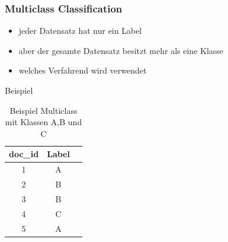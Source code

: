 \documentclass[12pt, xcolor=table]{beamer}
\begin{document}
\begin{frame}
    \frametitle{Multiclass Classification}
    \begin{itemize}
        \item jeder Datensatz hat nur ein Label
        \item aber der gesamte Datensatz besitzt mehr als eine Klasse
        \item welches Verfahrend wird verwendet
    \end{itemize}
    \begin{block}{Beispiel}
    \begin{center}
    \begin{table}
        \begin{tabular}{ccc}
            \tiny\textbf{doc\_id} &\tiny \textbf{Label}  \\
            \hline
            \tiny 1 &\tiny A  \\
            \tiny 2 &\tiny B  \\
            \tiny 3 &\tiny B  \\
            \tiny 4 &\tiny C  \\
            \tiny 5 &\tiny A  \\
        \end{tabular}
         \caption*{Beispiel Multiclass mit Klassen A,B und C}
    \end{table}
    \end{center}
    \end{block}
\end{frame}
\end{document}
